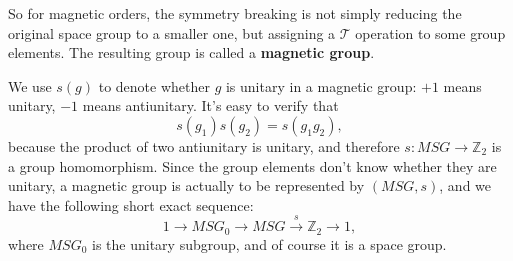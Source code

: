 \documentclass[hyperref, a4paper]{article}
\newcommand*{\concept}[1]{{\textbf{#1}}}
\begin{document}
So for magnetic orders, the symmetry breaking is not simply reducing the original space group to a smaller 
one, but assigning a $\mathcal{T}$ operation to some group elements. The resulting group is called 
a \concept{magnetic group}. 

We use $s(g)$ to denote whether $g$ is unitary in a magnetic group: $+1$ means unitary, $-1$ means antiunitary.
It's easy to verify that 
\begin{equation}
    s(g_1) s(g_2) = s(g_1 g_2),
\end{equation}
because the product of two antiunitary is unitary, and therefore $s: MSG \to \mathbb{Z}_2$ is a 
group homomorphism. Since the group elements don't know whether they are unitary, a magnetic group 
is actually to be represented by $(MSG, s)$, and we have the following short exact sequence: 
\begin{equation}
    1 \to MSG_0 \to MSG \stackrel{s}{\to} \mathbb{Z}_2 \to 1,
\end{equation}
where $MSG_0$ is the unitary subgroup, and of course it is a space group. 
\end{document}
